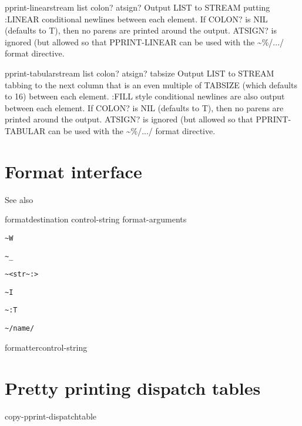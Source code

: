 \documentclass[10pt,english]{book}
\begin{document}
\begin{function}{pprint-linear}{stream list \op colon? atsign?}
  Output LIST to STREAM putting :LINEAR conditional newlines between each
   element. If COLON? is NIL (defaults to T), then no parens are printed
   around the output. ATSIGN? is ignored (but allowed so that PPRINT-LINEAR
   can be used with the \~{}\%/.../ format directive.
\end{function}

\begin{function}{pprint-tabular}{stream list \op colon? atsign? tabsize}
  Output LIST to STREAM tabbing to the next column that is an even multiple
   of TABSIZE (which defaults to 16) between each element. :FILL style
   conditional newlines are also output between each element. If COLON? is
   NIL (defaults to T), then no parens are printed around the output.
   ATSIGN? is ignored (but allowed so that PPRINT-TABULAR can be used with
   the \~{}\%/.../ format directive.
\end{function}

\section{Format interface}
\label{sec:form-direct-interf}

See also 

\begin{function}{format}{destination control-string \rest format-arguments}
\begin{list}{}{}
\item \verb!~W!
\item \verb!~_!
\item \verb!~<str~:>!
\item \verb!~I!
\item \verb!~:T!
\item \verb!~/name/!
\end{list}
\end{function}

\begin{macro}{formatter}{control-string}
  
\end{macro}

\section{Pretty printing dispatch tables}
\label{sec:pretty-print-disp}

\begin{function}{copy-pprint-dispatch}{\op table}
  
\end{function}
\end{document}
